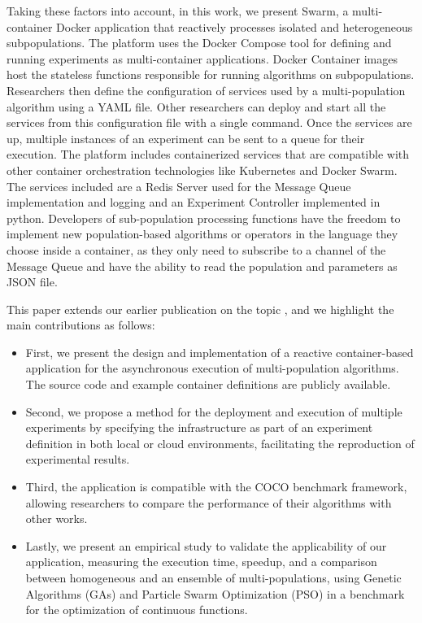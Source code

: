 \documentclass[review]{elsarticle}
\begin{document}
Taking these factors into account, in this work, we present Swarm, a  multi-container Docker application that reactively processes isolated and heterogeneous subpopulations. The platform uses the Docker Compose tool for defining and running experiments as multi-container applications. Docker Container images host the stateless functions responsible for running algorithms on subpopulations. Researchers then define the configuration of services used by a multi-population algorithm using a YAML file. Other researchers can deploy and start all the services from this configuration file with a single command. Once the services are up, multiple instances of an experiment can be sent to a queue for their execution.  The platform includes containerized services that are compatible with other container orchestration technologies like Kubernetes and Docker Swarm. The services included are a Redis Server used for the Message Queue implementation and logging and an Experiment Controller implemented in python.  Developers of sub-population processing functions have the freedom to implement new population-based algorithms or operators in the language they choose inside a container, as they only need to subscribe to a channel of the Message Queue and have the ability to read the population and parameters as JSON file.  

This paper extends our earlier publication on the topic \cite{guervos2018introducing}, and we highlight the main contributions as follows:

\begin{itemize}
	\item First, we present the design and implementation of a reactive container-based application for the asynchronous execution of multi-population algorithms. The source code and example container definitions are publicly available.
	\item Second, we propose a method for the deployment and execution of multiple experiments by specifying the infrastructure as part of an experiment definition in both local or cloud environments,  facilitating the reproduction of experimental results.
	\item Third, the application is compatible with the COCO benchmark framework, allowing researchers to compare the performance of their algorithms with other works.
	\item Lastly, we present an empirical study to validate the applicability of our application,  measuring the execution time, speedup, and a comparison between homogeneous and an ensemble of multi-populations, using Genetic Algorithms (GAs) and Particle Swarm Optimization (PSO) in a benchmark for the optimization of continuous functions.
\end{itemize}
\end{document}
